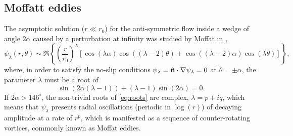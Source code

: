 \subsection{Moffatt eddies}

The asymptotic solution ($r \ll r_0$) for the anti-symmetric flow inside a wedge of angle $2\alpha$ caused by a perturbation at infinity was studied by Moffat in \cite{Moffatt64},
\begin{equation}
\psi_\lambda(r,\theta) \sim \Re\left\{\left(\frac{r}{r_0}\right)^\lambda \left[\cos{(\lambda\alpha)}\cos{\left((\lambda-2)\theta\right)}+\cos{\left((\lambda-2)\alpha\right)}\cos{(\lambda\theta)}\right]\right\},
\end{equation}
where, in order to satisfy the no-slip conditions $\psi_\lambda=\mathbf{\hat{n}}\cdot\nabla\psi_\lambda=0$ at $\theta=\pm\alpha$, the parameter $\lambda$ must be a root of
\begin{equation}\label{eq:roots}
\sin{\left(2\alpha(\lambda-1)\right)} + (\lambda-1)\sin{(2\alpha)}=0.
\end{equation}
If $2\alpha>146^\circ$, the non-trivial roots of \eqref{eq:roots} are complex, $\lambda=p + iq$, which means that $\psi_\lambda$ presents radial oscillations (periodic in $\log(r)$) of decaying amplitude at a rate of $r^{p}$, which is manifested as a sequence of counter-rotating vortices, commonly known as Moffat eddies.

